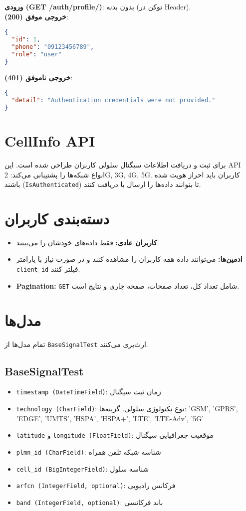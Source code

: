 \documentclass{report}
\begin{document}
\textbf{ورودی (GET /auth/profile/)}: بدون بدنه (توکن در Header). \\

\textbf{خروجی موفق (200)}:
\begin{lstlisting}[language=json]
{
  "id": 1,
  "phone": "09123456789",
  "role": "user"
}
\end{lstlisting}

\textbf{خروجی ناموفق (401)}:
\begin{lstlisting}[language=json]
{
  "detail": "Authentication credentials were not provided."
}
\end{lstlisting}

\section{CellInfo API}
برای ثبت و دریافت اطلاعات سیگنال سلولی کاربران طراحی شده است. این API انواع شبکه‌ها را پشتیبانی می‌کند: 2G, 3G, 4G, 5G. کاربران باید احراز هویت شده باشند (\texttt{IsAuthenticated}) تا بتوانند داده‌ها را ارسال یا دریافت کنند.

\section{دسته‌بندی کاربران}
\begin{itemize}
    \item \textbf{کاربران عادی:} فقط داده‌های خودشان را می‌بینند.
    \item \textbf{ادمین‌ها:} می‌توانند داده همه کاربران را مشاهده کنند و در صورت نیاز با پارامتر \texttt{client\_id} فیلتر کنند.
    \item \textbf{Pagination:} \texttt{GET} شامل تعداد کل، تعداد صفحات، صفحه جاری و نتایج است.
\end{itemize}

\section{مدل‌ها}
تمام مدل‌ها از \texttt{BaseSignalTest} ارث‌بری می‌کنند.

\subsection{BaseSignalTest}
\begin{itemize}
    \item \texttt{timestamp (DateTimeField)}: زمان ثبت سیگنال
    \item \texttt{technology (CharField)}: نوع تکنولوژی سلولی. گزینه‌ها: 'GSM', 'GPRS', 'EDGE', 'UMTS', 'HSPA', 'HSPA+', 'LTE', 'LTE-Adv', '5G'
    \item \texttt{latitude} و \texttt{longitude (FloatField)}: موقعیت جغرافیایی سیگنال
    \item \texttt{plmn\_id (CharField)}: شناسه شبکه تلفن همراه
    \item \texttt{cell\_id (BigIntegerField)}: شناسه سلول
    \item \texttt{arfcn (IntegerField, optional)}: فرکانس رادیویی
    \item \texttt{band (IntegerField, optional)}: باند فرکانسی
\end{itemize}
\end{document}
